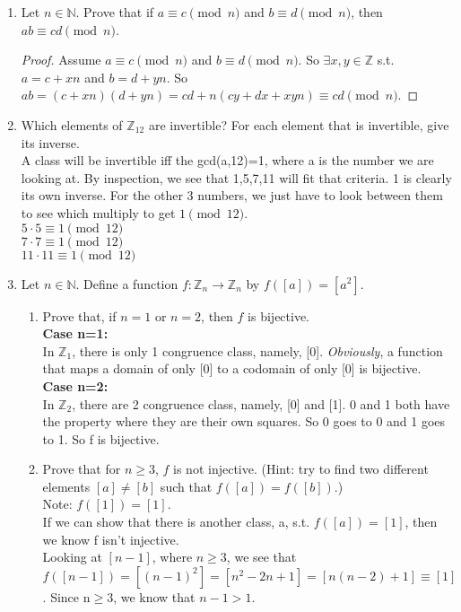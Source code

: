 \documentclass[12pt]{article}
\begin{document}
\begin{enumerate}

\item Let $n \in \mathbb N$. Prove that if $a \equiv c \pmod{n}$ and $b \equiv d \pmod{n}$, then $ab \equiv cd \pmod{n}$. 
\begin{proof}
	Assume $a \equiv c \pmod{n}$ and $b \equiv d \pmod{n}$. So $\exists x,y \in \mathbb{Z}$ s.t. $a=c+xn$ and $b=d+yn$. So $ab = (c+xn)(d+yn) = cd+n(cy+dx+xyn) \equiv cd \pmod n$.
\end{proof}

\medskip

\item Which elements of $\mathbb{Z}_{12}$ are invertible?  For each element that is invertible, give its inverse.\medskip\\
A class will be invertible iff the gcd(a,12)=1, where a is the number we are looking at. By inspection, we see that 1,5,7,11 will fit that criteria. 1 is clearly its own inverse. For the other 3 numbers, we just have to look between them to see which multiply to get $1 \pmod {12}$.\\
$5\cdot5\equiv1\pmod{12}$\\
$7\cdot7\equiv1\pmod{12}$\\
$11\cdot11\equiv1\pmod{12}$ 

\medskip
\item Let $n \in \mathbb{N}$.  Define a function $f: \mathbb{Z}_n \to \mathbb{Z}_n$ by $f([a]) = [a^2]$.  
	\begin{enumerate}
	\item Prove that, if $n = 1$ or $n = 2$, then $f$ is bijective.\medskip\\
	\textbf{Case n=1:}\\
	In $\mathbb{Z}_1$, there is only 1 congruence class, namely, [0]. \emph{Obviously}, a function that maps a domain of only [0] to a codomain of only [0] is bijective.\\
	\textbf{Case n=2:}\\
	In $\mathbb{Z}_2$, there are 2 congruence class, namely, [0] and [1]. 0 and 1 both have the property where they are their own squares. So 0 goes to 0 and 1 goes to 1. So f is bijective.\\
	\item Prove that for $n \ge 3$, $f$ is not injective.  (Hint: try to find two different elements $[a] \ne [b]$ such that $f([a]) = f([b])$.) \medskip\\
	Note: $f([1])=[1]$.\\
	If we can show that there is another class, a, s.t. $f([a])=[1]$, then we know f isn't injective.\\
	Looking at $[n-1]$, where $n\geq3$, we see that $f([n-1])=[(n-1)^2] = [n^2-2n+1] = [n(n-2)+1] \equiv [1]$. Since n$\geq$3, we know that $n-1>1$.\qedsymbol
	\end{enumerate}



\end{enumerate}
\end{document}
